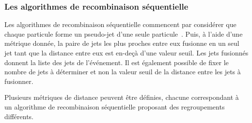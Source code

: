\subsubsection{Les algorithmes de recombinaison séquentielle}
Les algorithmes de recombinaison séquentielle commencent par considérer que chaque particule forme un pseudo-jet d'une seule particule~\cite{Cacciari:2011ma}.
Puis, à l'aide d'une métrique donnée, la paire de jets les plus proches entre eux fusionne en un seul jet tant que la distance entre eux est en-deçà d'une valeur seuil. Les jets fusionnés donnent la liste des jets de l'événement. Il est également possible de fixer le nombre de jets à déterminer et non la valeur seuil de la distance entre les jets à fusionner.
\par Plusieurs métriques de distance peuvent être définies, chacune correspondant à un algorithme de recombinaison séquentielle proposant des regroupements différents.
